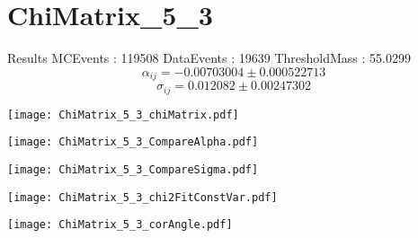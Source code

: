\documentclass[a4paper,12pt]{article}
\begin{document}
\section{ChiMatrix\_5\_3}
\begin{minipage}{0.49\linewidth} Results \newline
MCEvents : 119508\newline
DataEvents : 19639 \newline
ThresholdMass : 55.0299\\
$$\alpha_{ij} = -0.00703004\pm 0.000522713$$
$$\sigma_{ij} = 0.012082\pm 0.00247302$$
\end{minipage}\hfill
\begin{minipage}{0.49\linewidth} 
\texttt{[image: ChiMatrix\_5\_3\_chiMatrix.pdf]}\\
\end{minipage}
\hfill
\begin{minipage}{0.49\linewidth} 
\texttt{[image: ChiMatrix\_5\_3\_CompareAlpha.pdf]}\\
\end{minipage}
\hfill
\begin{minipage}{0.49\linewidth} 
\texttt{[image: ChiMatrix\_5\_3\_CompareSigma.pdf]}\\
\end{minipage}
\begin{minipage}{0.49\linewidth} 
\texttt{[image: ChiMatrix\_5\_3\_chi2FitConstVar.pdf]}\\
\end{minipage}
\hfill
\begin{minipage}{0.49\linewidth} 
\texttt{[image: ChiMatrix\_5\_3\_corAngle.pdf]}\\
\end{minipage}
\end{document}
